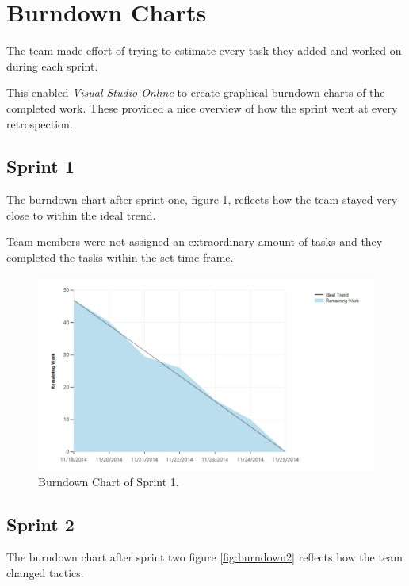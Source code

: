 \section{Burndown Charts}
The team made effort of trying to estimate every task they added and worked on during each sprint.


This enabled \textit{Visual Studio Online} to create graphical burndown charts of the completed work. These provided a nice overview of how the sprint went at every retrospection.

\subsection{Sprint 1}
The burndown chart after sprint one, figure \ref{fig:burndown1}, reflects how the team stayed very close to within the ideal trend. 


Team members were not assigned an extraordinary amount of tasks and they completed the tasks within the set time frame.

\begin{figure}[H]
	\centering
	\includegraphics[width=\textwidth]{Figures/Burndown1}
	\caption{Burndown Chart of Sprint 1.}
	    \label{fig:burndown1}
\end{figure}

\subsection{Sprint 2}
The burndown chart after sprint two figure \ref{fig:burndown2} reflects how the team changed tactics. 

